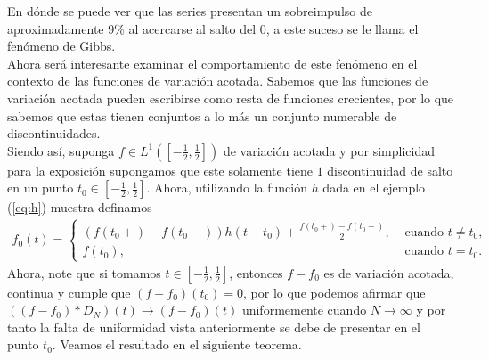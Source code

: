 En dónde se puede ver que las series presentan un sobreimpulso de aproximadamente $9\%$ al acercarse al salto del $0$, a este suceso se le llama el fenómeno de Gibbs.\\
Ahora será interesante examinar el comportamiento de este fenómeno en el contexto de las funciones de variación acotada. Sabemos que las funciones de variación acotada pueden escribirse como resta de funciones crecientes, por lo que sabemos que estas tienen conjuntos a lo más un conjunto numerable de discontinuidades.\\
Siendo así, suponga $f\in L^{1}([-\frac{1}{2},\frac{1}{2}])$ de variación acotada y por simplicidad para la exposición supongamos que este solamente tiene $1$ discontinuidad de salto en un punto $t_0\in [-\frac{1}{2},\frac{1}{2}]$.
Ahora, utilizando la función $h$ dada en el ejemplo (\ref{eq:h}) muestra definamos
\begin{equation}\label{eq:f0}
  \begin{split}
    f_0(t)= 
    \begin{cases}
      \left( f(t_0+)-f(t_0-) \right)h(t-t_0)+\frac{f(t_0+)-f(t_0-)}{2}, &\text{ cuando } t\neq t_0 \text{,} \\
      f(t_0), &\text{ cuando } t=t_0.
    \end{cases}  
  \end{split}
\end{equation}
Ahora, note que si tomamos $t\in[-\frac{1}{2},\frac{1}{2}]$, entonces $f-f_0$ es de variación acotada, continua y cumple que $(f-f_0)(t_0)=0$, por lo que podemos afirmar que $((f-f_0)*D_{N})(t)\to (f-f_0)(t)$ uniformemente cuando $N\to \infty$ y por tanto la falta de uniformidad vista anteriormente se debe de presentar en el punto $t_0$.
Veamos el resultado en el siguiente teorema.
